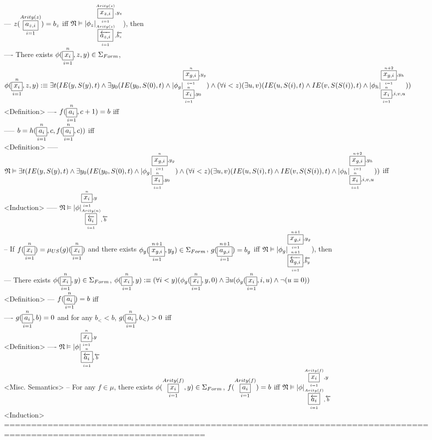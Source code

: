 \documentclass{book}
\newcommand{\is}{:\equiv}
\newcommand{\vdc}[3]{\underset{#2}{\overset{#3}{\fbox{$#1$}}}}
\newcommand{\sub}[3]{\left|#1\right|_{#3}^{#2}}
\begin{document}
			--- $z(\vdc{a_{z, i}}{i=1}{Arity(z)}) = b_z$ iff $\mathfrak{N} \vDash \sub{\phi_z}{\vdc{x_{z, i}}{i=1}{Arity(z)}, y_z}{\vdc{\overleftarrow{a_{z, i}}}{i=1}{Arity(z)}, \overleftarrow{b_z}}$), then \\
				---- There exists $\phi(\vdc{x_i}{i=1}{n}, z, y) \in \Sigma_{Form}$, $\phi(\vdc{x_i}{i=1}{n}, z, y) \is \exists t(IE(y, S(y), t) \land \\ \exists y_0(IE(y_0, S(0), t) \land \sub{\phi_g}{\vdc{x_{g, i}}{i=1}{n}, y_g}{\vdc{x_i}{i=1}{n}, y_0}) \land \\ (\forall i < z)(\exists u, v)(IE(u, S(i), t) \land IE(v, S(S(i)), t) \land \sub{\phi_h}{\vdc{x_{g, i}}{i=1}{n+2}, y_h}{\vdc{x_i}{i=1}{n}, i, v, u}))$ \\ <Definition>
				---- $f(\vdc{a_i}{i=1}{n}, c+1) = b$ iff \\
					----- $b = h(\vdc{a_i}{i=1}{n}, c, f(\vdc{a_i}{i=1}{n}, c))$ iff \\ <Definition>
					----- $\mathfrak{N} \vDash \exists t(IE(y, S(y), t) \land \\ \exists y_0(IE(y_0, S(0), t) \land \sub{\phi_g}{\vdc{x_{g, i}}{i=1}{n}, y_g}{\vdc{x_i}{i=1}{n}, y_0}) \land \\ (\forall i < z)(\exists u, v)(IE(u, S(i), t) \land IE(v, S(S(i)), t) \land \sub{\phi_h}{\vdc{x_{g, i}}{i=1}{n+2}, y_h}{\vdc{x_i}{i=1}{n}, i, v, u}))$ iff \\ <Induction>
					----- $\mathfrak{N} \vDash \sub{\phi}{\vdc{x_i}{i=1}{n}, y}{\vdc{\overleftarrow{a_i}}{i=1}{Arity(n)}, \overleftarrow{b}}$ \\
		-- If $f(\vdc{x_i}{i=1}{n}) = \mu_{US}(g)(\vdc{x_i}{i=1}{n})$ and there exists $\phi_g(\vdc{x_{g, i}}{i=1}{n+1}, y_g) \in \Sigma_{Form}$, $g(\vdc{a_{g, i}}{i=1}{n+1}) = b_g$ iff $\mathfrak{N} \vDash \sub{\phi_g}{\vdc{x_{g, i}}{i=1}{n+1}, y_g}{\vdc{\overleftarrow{a_{g, i}}}{i=1}{n+1}, \overleftarrow{b_g}}$), then \\
			--- There exists $\phi(\vdc{x_i}{i=1}{n}, y) \in \Sigma_{Form}$, $\phi(\vdc{x_i}{i=1}{n}, y) \is (\forall i < y)(\phi_g(\vdc{x_i}{i=1}{n}, y, 0) \land \exists u(\phi_g(\vdc{x_i}{i=1}{n}, i, u) \land \lnot(u \equiv 0))$ \\ <Definition>
			--- $f(\vdc{a_i}{i=1}{n}) = b$ iff \\
				---- $g(\vdc{a_i}{i=1}{n}, b) = 0$ and for any $b_< < b$, $g(\vdc{a_i}{i=1}{n}, b_<) > 0$ iff \\ <Definition>
				---- $\mathfrak{N} \vDash \sub{\phi}{\vdc{x_i}{i=1}{n}, y}{\vdc{\overleftarrow{a_i}}{i=1}{n}, \overleftarrow{b}}$ \\ <Misc. Semantics>
		-- For any $f \in \mu$, there exists $\phi(\vdc{x_i}{i=1}{Arity(f)}, y) \in \Sigma_{Form}$, $f(\vdc{a_i}{i=1}{Arity(f)}) = b$ iff $\mathfrak{N} \vDash \sub{\phi}{\vdc{x_i}{i=1}{Arity(f)}, y}{\vdc{\overleftarrow{a_i}}{i=1}{Arity(f)}, \overleftarrow{b}}$ \\ <Induction>
	===================================================================================================================
\end{document}
